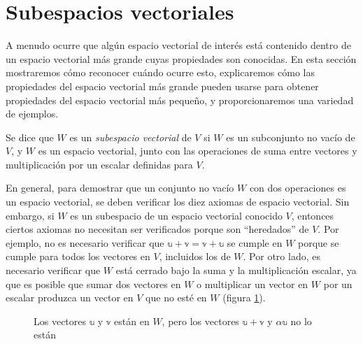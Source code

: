 \section{Subespacios vectoriales}

A menudo ocurre que algún espacio vectorial de interés está contenido dentro de un espacio vectorial más grande cuyas propiedades son conocidas. En esta sección mostraremos cómo reconocer cuándo ocurre esto, explicaremos cómo las propiedades del espacio vectorial más grande pueden usarse para obtener propiedades del espacio vectorial más pequeño, y proporcionaremos una variedad de ejemplos.

\newpage

\begin{definicion}{}{}
    Se dice que $W$ es un \emph{subespacio vectorial} de $V$ si $W$ es un subconjunto no vacío de $V$, y $W$ es un espacio vectorial, junto con las operaciones de suma entre vectores y multiplicación por un escalar definidas para $V$.
\end{definicion}

En general, para demostrar que un conjunto no vacío $W$ con dos operaciones es un espacio vectorial, se deben verificar los diez axiomas de espacio vectorial. Sin embargo, si $W$ es un subespacio de un espacio vectorial conocido $V$, entonces ciertos axiomas no necesitan ser verificados porque son “heredados” de $V$. Por ejemplo, no es necesario verificar que $\mathbb{u} + \mathbb{v} = \mathbb{v} + \mathbb{u}$ se cumple en $W$ porque se cumple para todos los vectores en $V$, incluidos los de $W$. Por otro lado, es necesario verificar que $W$ está cerrado bajo la suma y la multiplicación escalar, ya que es posible que sumar dos vectores en $W$ o multiplicar un vector en $W$ por un escalar produzca un vector en $V$ que no esté en $W$ (figura \ref{JAJJAJAJAJJQJQOOQPQZ}).
\begin{figure}[h!]
    \centering
    \caption{Los vectores $\mathbb{u}$ y $\mathbb{v}$ están en $W$, pero los vectores $\mathbb{u} + \mathbb{v}$ y $\alpha \mathbb{u}$ no lo están}
    \label{JAJJAJAJAJJQJQOOQPQZ}
\end{figure}

